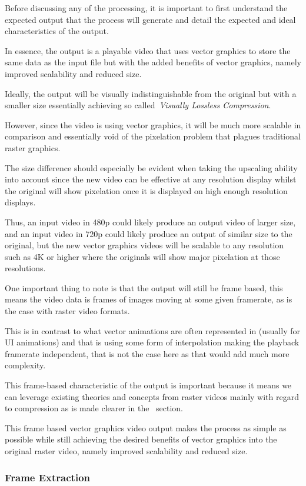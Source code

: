\documentclass[12pt]{article}
\newcommand{\sentence}{} %
\newcommand{\italic}[1]{\textit{#1}}
\begin{document}
    \tab
    Before discussing any of the processing, it is important to first understand the expected output that the process
    will generate and detail the expected and ideal characteristics of the output.
    \sentence
    In essence, the output is a playable video that uses vector graphics to store the same data as the input file but
    with the added benefits of vector graphics, namely improved scalability and reduced size.
    \sentence
    Ideally, the output will be visually indistinguishable from the original but with a smaller size essentially
    achieving so called~\italic{Visually Lossless Compression}.
    \sentence
    However, since the video is using vector graphics, it will be much more scalable in comparison and essentially
    void of the pixelation problem that plagues traditional raster graphics.
    \sentence
    The size difference should especially be evident when taking the upscaling ability into account since the new
    video can be effective at any resolution display whilst the original will show pixelation once it is displayed on
    high enough resolution displays.
    \sentence
    Thus, an input video in 480p could likely produce an output video of larger size, and an input video in 720p
    could likely produce an output of similar size to the original, but the new vector graphics videos will be
    scalable to any resolution such as 4K or higher where the originals will show major pixelation at those resolutions.
    \sentence
    One important thing to note is that the output will still be frame based, this means the video data is frames of
    images moving at some given framerate, as is the case with raster video formats.
    \sentence
    This is in contrast to what vector animations are often represented in (usually for UI animations) and that is
    using some form of interpolation making the playback framerate independent, that is not the case here as that
    would add much more complexity.
    \sentence
    This frame-based characteristic of the output is important because it means we can leverage existing theories and
    concepts from raster videos mainly with regard to compression as is made clearer in
    the~ section.
    \sentence
    This frame based vector graphics video output makes the process as simple as possible while still achieving the
    desired benefits of vector graphics into the original raster video, namely improved scalability and reduced size.

    \subsubsection{Frame Extraction}\label{subsubsec:frame-extraction}
\end{document}
